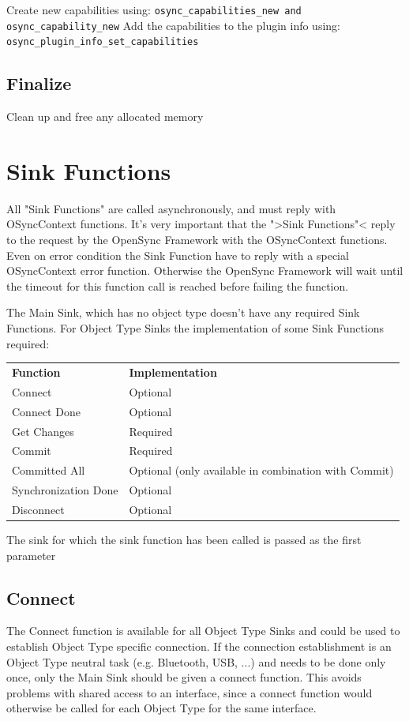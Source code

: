 Create new capabilities using:
\verb|osync_capabilities_new and osync_capability_new|
Add the capabilities to the plugin info using:
\verb|osync_plugin_info_set_capabilities|
\subsection{Finalize}
Clean up and free any allocated memory
\section{Sink Functions}
All "Sink Functions" are called asynchronously, and must reply with OSyncContext functions.
 It's very important that the ">Sink Functions"< reply to the
request by the OpenSync Framework with the OSyncContext functions. Even on
error condition the Sink Function have to reply with a special OSyncContext
error function. Otherwise the OpenSync Framework will wait until the timeout for this
function call is reached before failing the function.

The Main Sink, which has no object type doesn't have any required Sink 
Functions. For Object Type Sinks the implementation of some Sink 
Functions required:

\begin{center}
\begin{tabular}{ll}
\textbf{Function} & \textbf{Implementation} \\ 
Connect & Optional \\
Connect Done & Optional \\
Get Changes & Required \\ 
Commit & Required \\ 
Committed All & Optional (only available in combination with Commit)\\ 
Synchronization Done & Optional \\ 
Disconnect & Optional
\end{tabular}
\end{center}

The sink for which the sink function has been called is passed as the first parameter

\subsection{Connect}
The Connect function is available for all Object Type Sinks and could be used to
establish Object Type specific connection. If the connection establishment is an
Object Type neutral task (e.g. Bluetooth, USB, ...) and needs to be done only
once, only the Main Sink should be given a connect function. This avoids
problems with shared access to an interface, since a connect function would
otherwise be called for each Object Type for the same interface.

